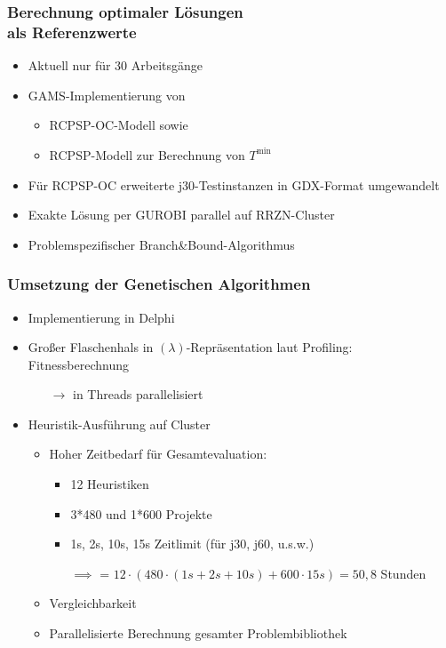 \begin{frame}[noframenumbering]
\frametitle{Berechnung optimaler Lösungen\\als Referenzwerte}
\begin{itemize}
\item Aktuell nur für 30 Arbeitsgänge\\[4mm]
\item GAMS-Implementierung von
	\begin{itemize}
	\item RCPSP-OC-Modell sowie
	\item RCPSP-Modell zur Berechnung von $T^{\mbox{min}}$\\[4mm]
	\end{itemize}
\item Für RCPSP-OC erweiterte j30-Testinstanzen in GDX-Format umgewandelt
\item Exakte Lösung per GUROBI parallel auf RRZN-Cluster
\item Problemspezifischer Branch\&Bound-Algorithmus
\end{itemize}
\end{frame}

\begin{frame}[noframenumbering]
\frametitle{Umsetzung der Genetischen Algorithmen}
\begin{itemize}
\item Implementierung in Delphi\\[4mm]
\item Großer Flaschenhals in $(\lambda)$-Repräsentation laut Profiling: Fitnessberechnung 
\begin{itemize}\item[$\rightarrow$] in Threads parallelisiert\\[4mm]\end{itemize}
\item Heuristik-Ausführung auf Cluster
\begin{itemize}
	\item Hoher Zeitbedarf für Gesamtevaluation:
		\begin{itemize}
		\item 12 Heuristiken
		\item 3*480 und 1*600 Projekte
		\item 1s, 2s, 10s, 15s Zeitlimit (für j30, j60, u.s.w.)
		\item[$\implies$] = $12 \cdot (480\cdot (1s + 2s + 10s) + 600\cdot15s ) = 50{,}8$ Stunden
		\end{itemize}
	\item Vergleichbarkeit
	\item Parallelisierte Berechnung gesamter Problembibliothek
\end{itemize}
\end{itemize}
\end{frame}

